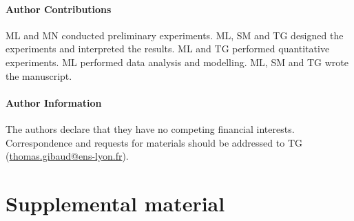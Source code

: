 \documentclass[twocolumn,superscriptaddress,showpacs,preprintnumbers,
amsmath,amssymb,prl]{revtex4-1}
\begin{document}
\paragraph*{Author Contributions}
ML and MN conducted preliminary experiments. ML, SM and TG designed the experiments and interpreted the results. ML and TG performed quantitative experiments. ML performed data analysis and modelling. ML, SM and TG wrote the manuscript.


\paragraph*{Author Information} 
The authors declare that they have no competing financial interests. 
Correspondence and requests for materials should be addressed to TG (\href{mailto:thomas.gibaud@ens-lyon.fr}{thomas.gibaud@ens-lyon.fr}).






\clearpage
\newpage
\setcounter{figure}{0}

\section*{Supplemental material}
\end{document}
